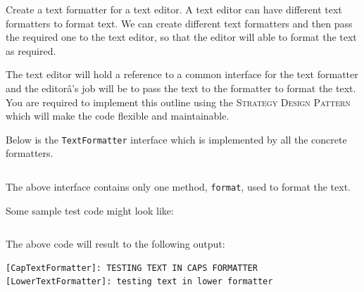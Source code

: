 \documentclass[12pt,a4paper]{exam}
\newcommand{\code}{/Users/keith/Documents/Courses/sdp/repo/worksheets/dp-two/kotlin/src}
\begin{document}
\begin{questions}

\question %
Create a text formatter for a text editor. 
A text editor can have different text formatters to format text. 
We can create different text formatters and then pass the required one to the text editor, 
so that the editor will able to format the text as required.

The text editor will hold a reference to a common interface for the text formatter 
and the editorâ's job will be to pass the text to the formatter to format the text.
You are required to implement this outline using the \textsc{Strategy Design Pattern} 
which will make the code flexible and maintainable. 

Below is the \verb!TextFormatter! interface which is implemented by all the concrete formatters.

\inputminted{scala}{\code/strategy/TextFormatter.kt}

The above interface contains only one method, \verb!format!, used to format the text.

Some sample test code might look like:

\inputminted{scala}{\code/strategy/TestStrategyPattern.kt}

The above code will result to the following output:

\begin{Verbatim}
[CapTextFormatter]: TESTING TEXT IN CAPS FORMATTER
[LowerTextFormatter]: testing text in lower formatter	
\end{Verbatim}

%
%
%
%
%


\end{questions}
\end{document}
